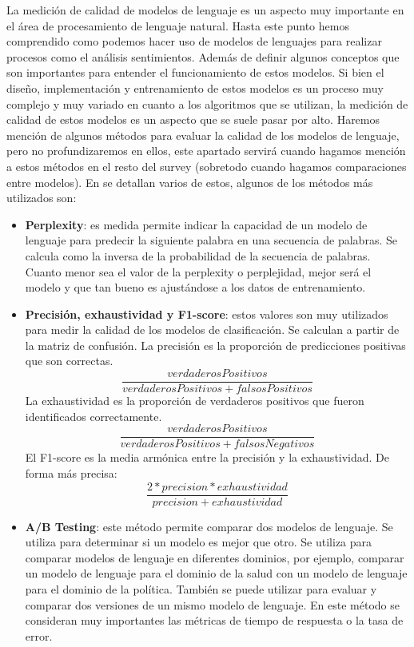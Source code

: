 \documentclass[12pt, conference]{IEEEtran}
\begin{document}
La medición de calidad de modelos de lenguaje es un aspecto muy importante en el área de procesamiento de lenguaje natural. Hasta este punto hemos comprendido como podemos hacer uso de modelos de lenguajes para realizar procesos como el análisis sentimientos. Además de definir algunos conceptos que son importantes para entender el funcionamiento de estos modelos. Si bien el diseño, implementación y entrenamiento de estos modelos es un proceso muy complejo y muy variado en cuanto a los algoritmos que se utilizan, la medición de calidad de estos modelos es un aspecto que se suele pasar por alto.
Haremos mención de algunos métodos para evaluar la calidad de los modelos de lenguaje, pero no profundizaremos en ellos, este apartado servirá cuando hagamos mención a estos métodos en el resto del survey (sobretodo cuando hagamos comparaciones entre modelos). En \cite{b22, b23, b24, b25, b26} se detallan varios de estos, algunos de los métodos más utilizados son:
\begin{itemize}
  \item \textbf{Perplexity}: es medida permite indicar la capacidad de un modelo de lenguaje para predecir la siguiente palabra en una secuencia de palabras. Se calcula como la inversa de la probabilidad de la secuencia de palabras. Cuanto menor sea el valor de la perplexity o perplejidad, mejor será el modelo y que tan bueno es ajustándose a los datos de entrenamiento.
  \item \textbf{Precisión, exhaustividad y F1-score}: estos valores son muy utilizados para medir la calidad de los modelos de clasificación. Se calculan a partir de la matriz de confusión. La precisión es la proporción de predicciones positivas que son correctas.
  \[\frac{verdaderosPositivos}{verdaderosPositivos + falsosPositivos}\]
  La exhaustividad es la proporción de verdaderos positivos que fueron identificados correctamente.
  \[\frac{verdaderosPositivos}{verdaderosPositivos + falsosNegativos}\]
  El F1-score es la media armónica entre la precisión y la exhaustividad. De forma más precisa:
  \[\frac{2 * precision * exhaustividad}{precision + exhaustividad}\]
  \item \textbf{A/B Testing}: este método permite comparar dos modelos de lenguaje. Se utiliza para determinar si un modelo es mejor que otro. Se utiliza para comparar modelos de lenguaje en diferentes dominios, por ejemplo, comparar un modelo de lenguaje para el dominio de la salud con un modelo de lenguaje para el dominio de la política. También se puede utilizar para evaluar y comparar dos versiones de un mismo modelo de lenguaje. En este método se consideran muy importantes las métricas de tiempo de respuesta o la tasa de error.
\end{itemize}
\end{document}
